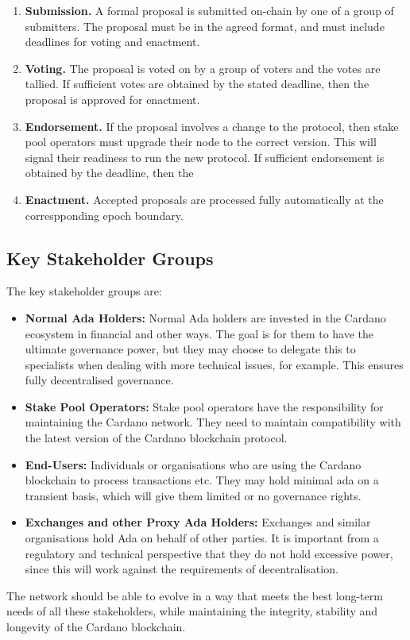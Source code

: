 \begin{enumerate}
\item
  \textbf{Submission.}  A formal proposal is submitted on-chain by one of a group of submitters.  The proposal must be in the agreed format, and must include deadlines for voting and enactment.
\item
  \textbf{Voting.}  The proposal is voted on by a group of voters and the votes are tallied.  If sufficient votes are obtained by the stated deadline, then the proposal is approved for enactment.
\item
  \textbf{Endorsement.}  If the proposal involves a change to the protocol, then stake pool operators must upgrade their node to the correct version.  This will signal their readiness to run the new protocol.
  If sufficient endorsement is obtained by the deadline, then the
\item
  \textbf{Enactment.}  Accepted proposals are processed fully automatically at the correspponding epoch boundary.
\end{enumerate}

\subsection{Key Stakeholder Groups}

The key stakeholder groups are:

\begin{itemize}
\item
  \textbf{Normal Ada Holders:}
  Normal Ada holders are invested in the Cardano ecosystem in financial and other ways.
  The goal is for them to have the ultimate governance power, but they may choose to delegate this to specialists when dealing with more technical issues, for example.
  This ensures fully decentralised governance.
  \item
  \textbf{Stake Pool Operators:}
  Stake pool operators have the responsibility for maintaining the Cardano network.  They need to maintain compatibility with the latest version of the Cardano blockchain protocol.
  \item
  \textbf{End-Users:}
  Individuals or organisations who are using the Cardano blockchain to process transactions etc.  They may hold minimal ada on a transient basis, which will give them limited or no governance rights.
  \item
  \textbf{Exchanges and other Proxy Ada Holders:}
  Exchanges and similar organisations hold Ada on behalf of other parties.  It is important from a regulatory and technical perspective that they do not hold excessive
  power, since this will work against the requirements of decentralisation.
\end{itemize}

The network should be able to evolve in a way that meets the best long-term needs of all these stakeholders, while maintaining the integrity, stability and longevity of
the Cardano blockchain.
